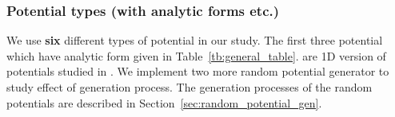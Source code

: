 \documentclass[a4paper,times,hidelinks,12pt]{article}
\begin{document}
\subsubsection{Potential types (with analytic forms etc.)}

We use \textbf{six} different types of potential in our study. The first three potential which have analytic form given in Table~\ref{tb:general_table}. are 1D version of potentials studied in \cite{mills2017deep}. We implement two more random potential generator to study effect of generation process. The generation processes of the random potentials are described in Section~\ref{sec:random_potential_gen}.

\newcommand{\infinitewell}{$
V(x) = 
    \begin{cases}
       0 &\quad\text{if } x_l < x < x_r  \\
       \infty &\quad\text{if } \textit{otherwise} \\
    \end{cases}
$}

\newcommand{\harmonicpot}{$ V(x) =  \frac{1}{2}m \omega^2 (x - x_0) ^2 $}

\newcommand{\gaussianpot}{$ V(x) = -A_1 \exp(\frac{(x - \mu_1)^2}{\sigma_1^2}) -A_2 \exp(\frac{(x - \mu_2)^2}{\sigma_2^2})  $
}

\newcommand{\randomexplation}{Summation of sines and cosines with random coefficients}
\end{document}
